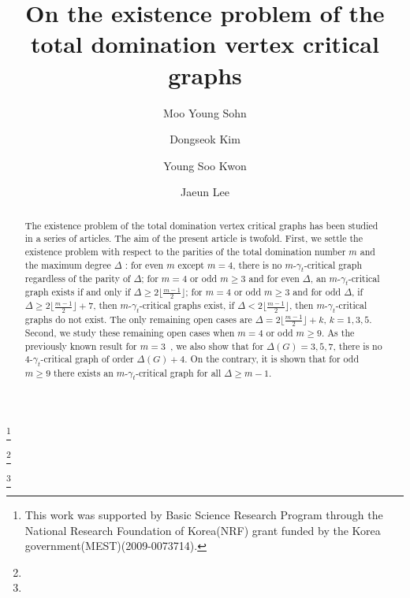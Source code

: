 \documentclass[12pt]{amsart}
\begin{document}
\title[Total domination vertex critical graphs]
{On the existence problem of the total domination vertex critical graphs}

\author{Moo Young Sohn}
\address{Mathematics, Changwon National
University Changwon 641-773, Korea}
\thanks{This work was supported by Basic Science Research Program through the National Research Foundation of Korea(NRF) grant funded by the Korea government(MEST)(2009-0073714).
}

\author{Dongseok Kim}
\address{Department of Mathematics \\Kyonggi University
\\ Suwon, 443-760 Korea}
\thanks{}

\author{Young Soo Kwon}
\address{Department of Mathematics \\Yeungnam University \\Kyongsan, 712-749, Korea}
\thanks{}

\author{Jaeun Lee}
\address{Department of Mathematics \\Yeungnam University \\Kyongsan, 712-749, Korea}



\maketitle

\begin{abstract}
The existence problem of the total domination vertex critical graphs
has been studied in a series of articles.
The aim of the present article is twofold. First, we settle the
existence problem with respect to the parities of the total
domination number $m$ and the maximum degree $\Delta$ : for even
$m$ except $m=4$, there is no $m$-$\gamma_t$-critical graph
regardless of the parity of $\Delta$;  for $m=4$ or odd $m \ge 3$
and for even $\Delta$, an $m$-$\gamma_t$-critical graph exists if
and only if $\Delta \ge 2 \lfloor \frac{m-1}{2}\rfloor$; for $m=4$
or odd $m \ge 3$ and for odd $\Delta$, if $\Delta \ge 2\lfloor
\frac{m-1}{2}\rfloor +7$, then $m$-$\gamma_t$-critical graphs
exist, if  $\Delta < 2\lfloor \frac{m-1}{2}\rfloor$, then
$m$-$\gamma_t$-critical graphs do not exist. The only remaining
open cases are $\Delta = 2\lfloor \frac{m-1}{2}\rfloor +k$, $k=1,
3, 5$. Second, we study these remaining open cases when $m=4$ or
odd $m \ge 9$. As the previously known result for $m =
3$~\cite{GHHM, CS}, we also show that for $\Delta(G)= 3, 5, 7$,
there is no $4$-$\gamma_{t}$-critical graph of order
$\Delta(G)+4$. On the contrary, it is shown that for odd $m \ge 9$
there exists an $m$-$\gamma_t$-critical graph for all $\Delta \ge
m-1$.
\end{abstract}
\end{document}
